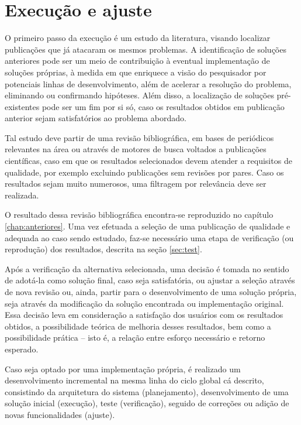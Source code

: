 \documentclass[cic,tc]{iiufrgs}
\begin{document}
\section{Execução e ajuste}
\label{sec:exec}

O primeiro passo da execução é um estudo da literatura, visando localizar
publicações que já atacaram os mesmos problemas. A identificação de soluções
anteriores pode ser um meio de contribuição à eventual implementação de
soluções próprias, à medida em que enriquece a visão do pesquisador por
potenciais linhas de desenvolvimento, além de acelerar a resolução do problema,
eliminando ou confirmando hipóteses. Além disso, a localização de soluções
pré-existentes pode ser um fim por si só, caso os resultados obtidos em
publicação anterior sejam satisfatórios ao problema abordado. 

Tal estudo deve partir de uma revisão bibliográfica, em bases de periódicos
relevantes na área ou através de motores de busca voltados a publicações
científicas, caso em que os resultados selecionados devem atender a requisitos
de qualidade, por exemplo excluindo publicações sem revisões por pares. Caso os
resultados sejam muito numerosos, uma filtragem por relevância deve ser
realizada.

O resultado dessa revisão bibliográfica encontra-se reproduzido no capítulo
\ref{chap:anteriores}. Uma vez efetuada a seleção de uma publicação de
qualidade e adequada ao caso sendo estudado, faz-se necessário uma etapa de
verificação (ou reprodução) dos resultados, descrita na seção \ref{sec:test}.

Após a verificação da alternativa selecionada, uma decisão é tomada no sentido
de adotá-la como solução final, caso seja satisfatória, ou ajustar a seleção
através de nova revisão ou, ainda, partir para o desenvolvimento de uma solução
própria, seja através da modificação da solução encontrada ou implementação
original. Essa decisão leva em consideração a satisfação dos usuários com os
resultados obtidos, a possibilidade teórica de melhoria desses resultados, bem
como a possibilidade prática -- isto é, a relação entre esforço necessário e
retorno esperado.

Caso seja optado por uma implementação própria, é realizado um desenvolvimento
incremental na mesma linha do ciclo global cá descrito, consistindo da
arquitetura do sistema (planejamento), desenvolvimento de uma solução inicial
(execução), teste (verificação), seguido de correções ou adição de novas
funcionalidades (ajuste).
\end{document}
